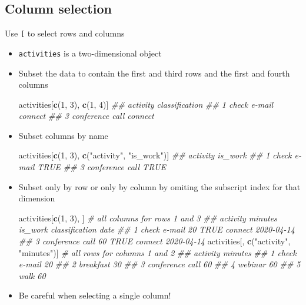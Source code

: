 \documentclass[]{book}
\newenvironment{Shaded}{\begin{snugshade}}{\end{snugshade}}
\newcommand{\CommentTok}[1]{\textcolor[rgb]{0.56,0.35,0.01}{\textit{#1}}}
\newcommand{\DecValTok}[1]{\textcolor[rgb]{0.00,0.00,0.81}{#1}}
\newcommand{\KeywordTok}[1]{\textcolor[rgb]{0.13,0.29,0.53}{\textbf{#1}}}
\newcommand{\NormalTok}[1]{#1}
\newcommand{\StringTok}[1]{\textcolor[rgb]{0.31,0.60,0.02}{#1}}
\begin{document}
\hypertarget{column-selection}{%
\subsection*{Column selection}\label{column-selection}}

Use \texttt{{[}} to select rows and columns

\begin{itemize}
\item
  \texttt{activities} is a two-dimensional object
\item
  Subset the data to contain the first and third rows and the first and fourth columns

\begin{Shaded}
\begin{Highlighting}[]
\NormalTok{activities[}\KeywordTok{c}\NormalTok{(}\DecValTok{1}\NormalTok{, }\DecValTok{3}\NormalTok{), }\KeywordTok{c}\NormalTok{(}\DecValTok{1}\NormalTok{, }\DecValTok{4}\NormalTok{)]}
\CommentTok{##          activity classification}
\CommentTok{## 1    check e-mail        connect}
\CommentTok{## 3 conference call        connect}
\end{Highlighting}
\end{Shaded}
\item
  Subset columns by name

\begin{Shaded}
\begin{Highlighting}[]
\NormalTok{activities[}\KeywordTok{c}\NormalTok{(}\DecValTok{1}\NormalTok{, }\DecValTok{3}\NormalTok{), }\KeywordTok{c}\NormalTok{(}\StringTok{"activity"}\NormalTok{, }\StringTok{"is_work"}\NormalTok{)]}
\CommentTok{##          activity is_work}
\CommentTok{## 1    check e-mail    TRUE}
\CommentTok{## 3 conference call    TRUE}
\end{Highlighting}
\end{Shaded}
\item
  Subset only by row or only by column by omiting the subscript index for that dimension

\begin{Shaded}
\begin{Highlighting}[]
\NormalTok{activities[}\KeywordTok{c}\NormalTok{(}\DecValTok{1}\NormalTok{, }\DecValTok{3}\NormalTok{), ]                  }\CommentTok{# all columns for rows 1 and 3}
\CommentTok{##          activity minutes is_work classification       date}
\CommentTok{## 1    check e-mail      20    TRUE        connect 2020-04-14}
\CommentTok{## 3 conference call      60    TRUE        connect 2020-04-14}
\NormalTok{activities[, }\KeywordTok{c}\NormalTok{(}\StringTok{"activity"}\NormalTok{, }\StringTok{"minutes"}\NormalTok{)] }\CommentTok{# all rows for columns 1 and 2}
\CommentTok{##          activity minutes}
\CommentTok{## 1    check e-mail      20}
\CommentTok{## 2       breakfast      30}
\CommentTok{## 3 conference call      60}
\CommentTok{## 4         webinar      60}
\CommentTok{## 5            walk      60}
\end{Highlighting}
\end{Shaded}
\item
  Be careful when selecting a single column!


\end{itemize}
\end{document}
